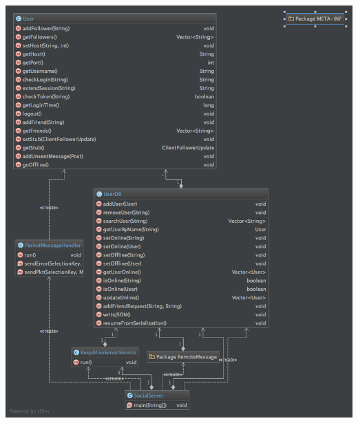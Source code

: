 \documentclass[]{article}
\begin{document}
\includegraphics[width=\linewidth]{Server}
\end{document}
